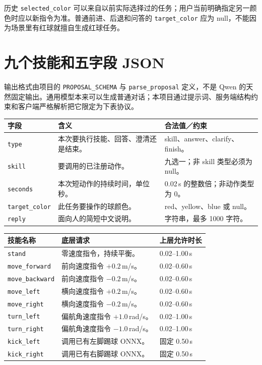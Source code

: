 历史 \texttt{selected\_color} 可以来自以前实际选择过的任务；用户当前明确指定另一颜色时应以新指令为准。普通前进、后退和问答的 \texttt{target\_color} 应为 null，不能因为场景里有红球就擅自生成红球任务。

\section{九个技能和五字段 JSON}

输出格式由项目的 \texttt{PROPOSAL\_SCHEMA} 与 \texttt{parse\_proposal} 定义，不是 Qwen 的天然固定输出。通用模型本来可以生成普通对话；本项目通过提示词、服务端结构约束和客户端严格解析把它限定为下表协议。

\begin{longtable}{P{3.8cm}P{6.1cm}P{4.6cm}}
\hline
字段 & 含义 & 合法值／约束\\
\hline
\endhead
\texttt{type} & 本次要执行技能、回答、澄清还是结束。 & skill、answer、clarify、finish。\\
\texttt{skill} & 要调用的已注册动作。 & 九选一；非 skill 类型必须为 null。\\
\texttt{seconds} & 本次短动作的持续时间，单位秒。 & 0.02\,s 的整数倍；非动作类型为 0。\\
\texttt{target\_color} & 此任务要操作的球颜色。 & red、yellow、blue 或 null。\\
\texttt{reply} & 面向人的简短中文说明。 & 字符串，最多 1000 字符。\\
\hline
\end{longtable}

\begin{longtable}{P{4.3cm}P{6.3cm}P{3.9cm}}
\hline
技能名称 & 底层请求 & 上层允许时长\\
\hline
\endhead
\texttt{stand} & 零速度指令，持续平衡。 & 0.02--1.00\,s\\
\texttt{move\_forward} & 前向速度指令 $+0.2$\,m/s。 & 0.02--0.60\,s\\
\texttt{move\_backward} & 前向速度指令 $-0.2$\,m/s。 & 0.02--0.60\,s\\
\texttt{move\_left} & 横向速度指令 $+0.2$\,m/s。 & 0.02--0.60\,s\\
\texttt{move\_right} & 横向速度指令 $-0.2$\,m/s。 & 0.02--0.60\,s\\
\texttt{turn\_left} & 偏航角速度指令 $+1.0$\,rad/s。 & 0.02--1.00\,s\\
\texttt{turn\_right} & 偏航角速度指令 $-1.0$\,rad/s。 & 0.02--1.00\,s\\
\texttt{kick\_left} & 调用已有左脚踢球 ONNX。 & 固定 0.50\,s\\
\texttt{kick\_right} & 调用已有右脚踢球 ONNX。 & 固定 0.50\,s\\
\hline
\end{longtable}

